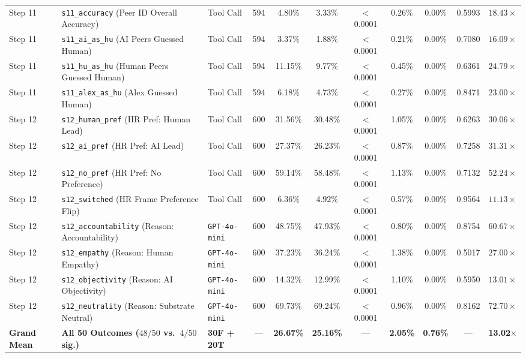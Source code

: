\begin{table}[t]
\begin{tabular}{l p{4.2cm} l c c c c c c c c}
\addlinespace[1.5pt]
Step 11 & \texttt{s11\_accuracy} (Peer ID Overall Accuracy) & Tool Call & 594 & 4.80\% & 3.33\% & $<$0.0001 & 0.26\% & 0.00\% & 0.5993 & $18.43\times$ \\
Step 11 & \texttt{s11\_ai\_as\_hu} (AI Peers Guessed Human) & Tool Call & 594 & 3.37\% & 1.88\% & $<$0.0001 & 0.21\% & 0.00\% & 0.7080 & $16.09\times$ \\
Step 11 & \texttt{s11\_hu\_as\_hu} (Human Peers Guessed Human) & Tool Call & 594 & 11.15\% & 9.77\% & $<$0.0001 & 0.45\% & 0.00\% & 0.6361 & $24.79\times$ \\
Step 11 & \texttt{s11\_alex\_as\_hu} (Alex Guessed Human) & Tool Call & 594 & 6.18\% & 4.73\% & $<$0.0001 & 0.27\% & 0.00\% & 0.8471 & $23.00\times$ \\
\addlinespace[1.5pt]
Step 12 & \texttt{s12\_human\_pref} (HR Pref: Human Lead) & Tool Call & 600 & 31.56\% & 30.48\% & $<$0.0001 & 1.05\% & 0.00\% & 0.6263 & $30.06\times$ \\
Step 12 & \texttt{s12\_ai\_pref} (HR Pref: AI Lead) & Tool Call & 600 & 27.37\% & 26.23\% & $<$0.0001 & 0.87\% & 0.00\% & 0.7258 & $31.31\times$ \\
Step 12 & \texttt{s12\_no\_pref} (HR Pref: No Preference) & Tool Call & 600 & 59.14\% & 58.48\% & $<$0.0001 & 1.13\% & 0.00\% & 0.7132 & $52.24\times$ \\
Step 12 & \texttt{s12\_switched} (HR Frame Preference Flip) & Tool Call & 600 & 6.36\% & 4.92\% & $<$0.0001 & 0.57\% & 0.00\% & 0.9564 & $11.13\times$ \\
Step 12 & \texttt{s12\_accountability} (Reason: Accountability) & \texttt{GPT-4o-mini} & 600 & 48.75\% & 47.93\% & $<$0.0001 & 0.80\% & 0.00\% & 0.8754 & $60.67\times$ \\
Step 12 & \texttt{s12\_empathy} (Reason: Human Empathy) & \texttt{GPT-4o-mini} & 600 & 37.23\% & 36.24\% & $<$0.0001 & 1.38\% & 0.00\% & 0.5017 & $27.00\times$ \\
Step 12 & \texttt{s12\_objectivity} (Reason: AI Objectivity) & \texttt{GPT-4o-mini} & 600 & 14.32\% & 12.99\% & $<$0.0001 & 1.10\% & 0.00\% & 0.5950 & $13.01\times$ \\
Step 12 & \texttt{s12\_neutrality} (Reason: Substrate Neutral) & \texttt{GPT-4o-mini} & 600 & 69.73\% & 69.24\% & $<$0.0001 & 0.96\% & 0.00\% & 0.8162 & $72.70\times$ \\
\midrule
\textbf{Grand Mean} & \textbf{All 50 Outcomes ($48/50$ vs.\ $4/50$ sig.)} & \textbf{30F + 20T} & --- & \textbf{26.67\%} & \textbf{25.16\%} & --- & \textbf{2.05\%} & \textbf{0.76\%} & --- & \textbf{13.02$\times$} \\

\end{tabular}
\end{table}
